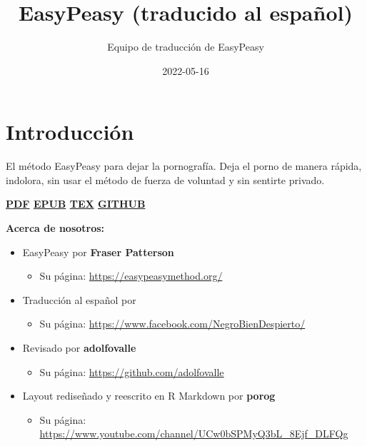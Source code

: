 \documentclass[
]{book}
\title{EasyPeasy (traducido al español)}
\author{Equipo de traducción de EasyPeasy}
\date{2022-05-16}
\providecommand{\tightlist}{%
  \setlength{\itemsep}{0pt}\setlength{\parskip}{0pt}}
\begin{document}
\maketitle

{
\setcounter{tocdepth}{1}
\tableofcontents
}
\hypertarget{introducciuxf3n}{%
\chapter{Introducción}\label{introducciuxf3n}}

El método EasyPeasy para dejar la pornografía. Deja el porno de manera rápida, indolora, sin usar el método de fuerza de voluntad y sin sentirte privado.

{\textbf{\href{easypeasyespanol.pdf}{PDF} \textbar{} \href{easypeasyespanol.epub}{EPUB} \textbar{} \href{easypeasyespanol.tex}{TEX} \textbar{} \href{https://github.com/easypeasyespanol/easypeasyespanol.github.io}{GITHUB}}}

\textbf{Acerca de nosotros:}

\begin{itemize}
\tightlist
\item
  EasyPeasy por \textbf{Fraser Patterson}

  \begin{itemize}
  \tightlist
  \item
    Su página: \url{https://easypeasymethod.org/}
  \end{itemize}
\item
  Traducción al español por \textbf{\citet{NegroBienDespierto}}

  \begin{itemize}
  \tightlist
  \item
    Su página: \url{https://www.facebook.com/NegroBienDespierto/}
  \end{itemize}
\item
  Revisado por \textbf{adolfovalle}

  \begin{itemize}
  \tightlist
  \item
    Su página: \url{https://github.com/adolfovalle}
  \end{itemize}
\item
  Layout rediseñado y reescrito en R Markdown por \textbf{porog}

  \begin{itemize}
  \tightlist
  \item
    Su página: \url{https://www.youtube.com/channel/UCw0bSPMyQ3bL_8Ejf_DLFQg}
  \end{itemize}
\end{itemize}
\end{document}
